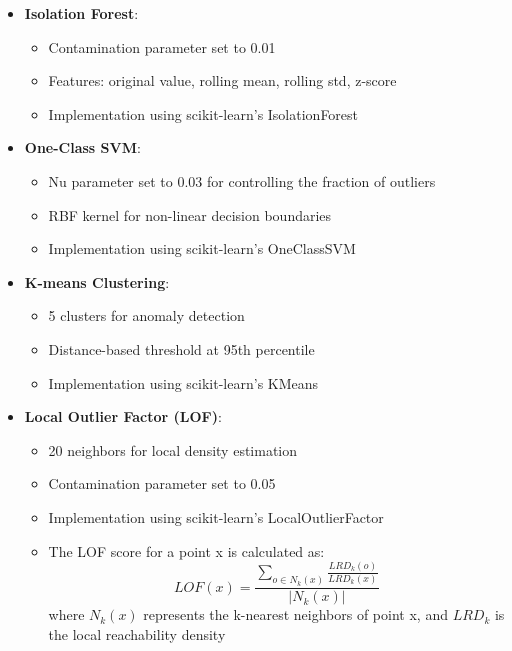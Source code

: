 \documentclass[conference]{IEEEtran}
\begin{document}
\begin{itemize}
    \item \textbf{Isolation Forest}:
    \begin{itemize}
        \item Contamination parameter set to 0.01
        \item Features: original value, rolling mean, rolling std, z-score
        \item Implementation using scikit-learn's IsolationForest
    \end{itemize}
    
    \item \textbf{One-Class SVM}:
    \begin{itemize}
        \item Nu parameter set to 0.03 for controlling the fraction of outliers
        \item RBF kernel for non-linear decision boundaries
        \item Implementation using scikit-learn's OneClassSVM
    \end{itemize}
    
    \item \textbf{K-means Clustering}:
    \begin{itemize}
        \item 5 clusters for anomaly detection
        \item Distance-based threshold at 95th percentile
        \item Implementation using scikit-learn's KMeans
    \end{itemize}
    
    \item \textbf{Local Outlier Factor (LOF)}:
    \begin{itemize}
        \item 20 neighbors for local density estimation
        \item Contamination parameter set to 0.05
        \item Implementation using scikit-learn's LocalOutlierFactor
        \item The LOF score for a point x is calculated as:
        \[
        LOF(x) = \frac{\sum\limits_{o\in N_k(x)} \frac{LRD_k(o)}{LRD_k(x)}}{|N_k(x)|}
        \]
        where $N_k(x)$ represents the k-nearest neighbors of point x, and $LRD_k$ is the local reachability density
    \end{itemize}
\end{itemize}
\end{document}
